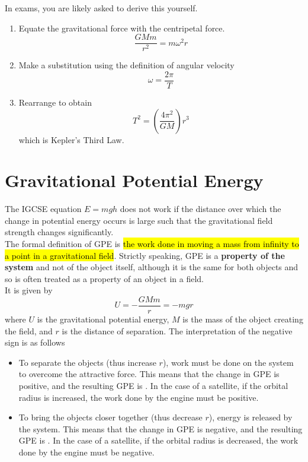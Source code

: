 \documentclass[a4paper,12pt]{article}
\let\oldsection\section
\renewcommand\section{\clearpage\oldsection}
\newcommand{\lb}{\\[8pt]}
\newcommand{\paren}[1]{\left(#1\right)}
\begin{document}
In exams, you are likely asked to derive this yourself.
\begin{enumerate}
  \item Equate the gravitational force with the centripetal force.
        $$\frac{GMm}{r^2} = m\omega^2r$$
  \item Make a substitution using the definition of angular velocity
        $$\omega = \frac{2\pi}{T}$$

  \item Rearrange to obtain \begin{equation}\label{eq:kepler}
          T^2 = \paren{\frac{4\pi^2}{GM}}r^3\end{equation}
        which is Kepler's Third Law.
\end{enumerate}

\section{Gravitational Potential Energy}

The IGCSE equation $E = mgh$ does not work if the distance over which the change in potential energy occurs is large such that the gravitational field strength changes significantly.\lb
The formal definition of GPE is \hl{the work done in moving a mass from infinity to a point in a gravitational field}. Strictly speaking, GPE is a \textbf{property of the system} and not of the object itself, although it is the same for both objects and so is often treated as a property of an object in a field.\lb
It is given by
$$U = -\frac{GMm}{r} = -mgr$$
where $U$ is the gravitational potential energy, $M$ is the mass of the object creating the field, and $r$ is the distance of separation. The interpretation of the negative sign is as follows
\begin{itemize}
  \item To separate the objects (thus increase $r$), work must be done on the system to overcome the attractive force. This means that the change in GPE is positive, and the resulting GPE is . In the case of a satellite, if the orbital radius is increased, the work done by the engine must be positive.
  \item To bring the objects closer together (thus decrease $r$), energy is released by the system. This means that the change in GPE is negative, and the resulting GPE is . In the case of a satellite, if the orbital radius is decreased, the work done by the engine must be negative.
\end{itemize}
\end{document}
